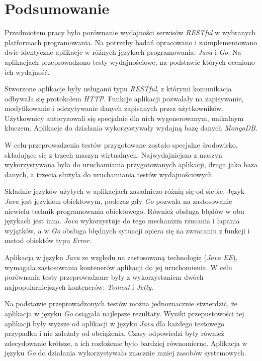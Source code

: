 \chapter{Podsumowanie}

Przedmiotem pracy było porównanie wydajności serwisów \textsl{RESTful} w wybranych platformach programowania. Na potrzeby badań opracowano i zaimplementowano dwie identyczne aplikacje w różnych językach programowania: \textsl{Java} i \textsl{Go}. Na aplikacjach przeprowadzono testy wydajnościowe, na podstawie których oceniono ich wydajność.

Stworzone aplikacje były usługami typu \textsl{RESTful}, z którymi komunikacja odbywała się protokołem \textsl{HTTP}. Funkcje aplikacji pozwalały na zapisywanie, modyfikowanie i odczytywanie danych  zapisanych przez użytkowników. Użytkownicy autoryzowali się specjalnie dla nich wygenerowanym, unikalnym kluczem. Aplikacje do działania wykorzystywały wydajną bazę danych \textsl{MongoDB}.

W celu przeprowadzenia testów przygotowane zostało specjalne środowisko, składające się z trzech maszyn wirtualnych. Najwydajniejsza z maszyn wykorzystywana była do uruchamiania przygotowanych aplikacji, druga jako baza danych, a  trzecia  służyła do uruchamiania testów wydajnościowych.

Składnie języków użytych w aplikacjach zasadniczo różnią się od siebie. Język \textsl{Java} jest językiem obiektowym, podczas gdy \textsl{Go} pozwala na zastosowanie niewielu technik programowania obiektowego. Również obsługa błędów w obu językach jest inna. \textsl{Java} wykorzystuje do tego mechanizm rzucania i łapania wyjątków, a w \textsl{Go} obsługa błędnych sytuacji opiera się na zwracaniu z funkcji i metod obiektów typu \textsl{Error}.

Aplikacja w języku \textsl{Java} ze względu na zastosowaną technologię (\textsl{Java EE}), wymagała zastosowania kontenerów aplikacji do jej uruchomienia. W celu porównania testy przeprowadzane były z wykorzystaniem dwóch najpopularniejszych kontenerów: \textsl{Tomcat} i \textsl{Jetty}. 

Na podstawie  przeprowadzonych testów można jednoznacznie stwierdzić, że aplikacja w języku \textsl{Go} osiągała najlepsze rezultaty. Wyniki przepustowości tej aplikacji były wyższe od aplikacji w języku \textsl{Java} dla każdego  testowego przypadku i nie zależały od obciążenia.  Czasy odpowiedzi były również zdecydowanie krótsze, a ich rozłożenie było bardziej równomierne. Aplikacja w języku \textsl{Go} do działania wykorzystywała znacznie mniej zasobów systemowych.    

